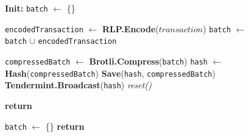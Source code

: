 \begin{figure}[t!]
  \begin{adjustbox}{minipage=[t]{\columnwidth}}
    \begin{algorithm}[H]
      \renewcommand{\thealgorithm}{Hash Collector}         
      \caption{}%
      \label{alg:collector-hash}%
      \small
      \begin{algorithmic}[1]
            \State \textbf{Init:} \texttt{batch} $\leftarrow$ \{\}
      
            \label{alg3:add_tx}
            		\State \texttt{encodedTransaction} $\leftarrow$ \textbf{RLP.Encode}($transaction$)
				\State \texttt{batch} $\leftarrow$ \texttt{batch} $\cup$ \texttt{encodedTransaction}
            
             		\State \texttt{compressedBatch} $\leftarrow$  \textbf{Brotli.Compress}(\texttt{batch})
             		\State \texttt{hash} $\leftarrow$ \textbf{Hash}(\texttt{compressedBatch})
             		\State \textbf{Save}(\texttt{hash}, \texttt{compressedBatch})
                		\State \textbf{Tendermint.Broadcast}(\texttt{hash})
                		\State \textit{reset()}
                \EndIf
                	
                \State \textbf{return}
            \EndFunction
            
            \label{alg3:reset}
            		\State \texttt{batch} $\leftarrow$ \{\}
                \State \textbf{return}
            \EndFunction
        \end{algorithmic}
      \end{algorithm}
	\end{adjustbox}
  \end{figure}

